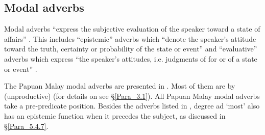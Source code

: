 \subsection{Modal adverbs}
\label{Para_5.4.4}
Modal adverbs “express the subjective evaluation of the speaker toward a state of affairs” {\citep[751]{Bussmann.1996}}. This includes “epistemic” adverbs which “denote the speaker’s attitude toward the truth, certainty or probability of the state or event” and “evaluative” adverbs which express “the speaker’s  attitudes, i.e. judgments of  for or  of a state or event” \citep[92–93]{Givon.2001}.



The Papuan Malay modal adverbs are presented in .
 Most of them are  by (unproductive)  (for details on  see §\ref{Para_3.1}). All Papuan Malay modal adverbs take a pre-pred\-icate position. Besides the adverbs listed in  , degree ad  ‘most’ also has an epistemic function when it precedes the subject, as discussed in §\ref{Para_5.4.7}.


